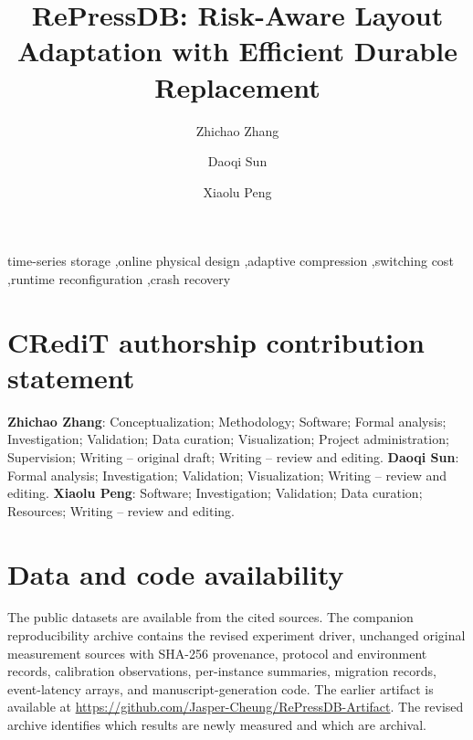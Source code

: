 \documentclass[final,5p,times,twocolumn,numbers]{elsarticle}
\begin{document}
\begin{frontmatter}
\title{RePressDB: Risk-Aware Layout Adaptation with Efficient Durable Replacement}
\author[aff1]{Zhichao Zhang}
\author[aff1]{Daoqi Sun}
\author[aff2]{Xiaolu Peng}
\address[aff1]{School of Science, Minzu University of China, No. 27 Zhongguancun South Avenue, Beijing, 100081, China}
\address[aff2]{School of Navigation, Dalian Maritime University, No. 1 Linghai Road, Ganjingzi District, Dalian 116026, China}


\begin{abstract}

\end{abstract}
\begin{keyword}
time-series storage \sep online physical design \sep adaptive compression \sep switching cost \sep runtime reconfiguration \sep crash recovery
\end{keyword}
\end{frontmatter}





\FloatBarrier


\section*{CRediT authorship contribution statement}
\textbf{Zhichao Zhang}: Conceptualization; Methodology; Software; Formal analysis; Investigation; Validation; Data curation; Visualization; Project administration; Supervision; Writing -- original draft; Writing -- review and editing. \textbf{Daoqi Sun}: Formal analysis; Investigation; Validation; Visualization; Writing -- review and editing. \textbf{Xiaolu Peng}: Software; Investigation; Validation; Data curation; Resources; Writing -- review and editing.
\section*{Data and code availability}
The public datasets are available from the cited sources. The companion reproducibility archive contains the revised experiment driver, unchanged original measurement sources with SHA-256 provenance, protocol and environment records, calibration observations, per-instance summaries, migration records, event-latency arrays, and manuscript-generation code. The earlier artifact is available at \url{https://github.com/Jasper-Cheung/RePressDB-Artifact}. The revised archive identifies which results are newly measured and which are archival.
\end{document}
